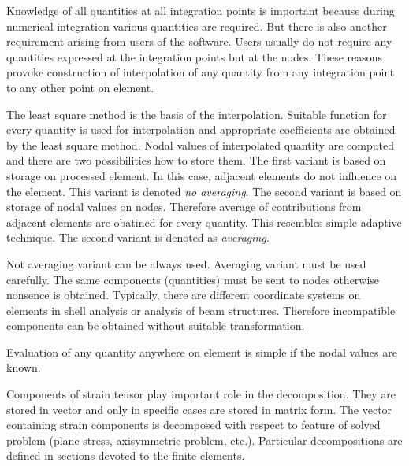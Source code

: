 Knowledge of all quantities at all integration points is important because during numerical integration
various quantities are required. But there is also another requirement arising from users of the software.
Users usually do not require any quantities expressed at the integration points but at the nodes.
These reasons provoke construction of interpolation of any quantity from any integration point to any other
point on element.

The least square method is the basis of the interpolation. Suitable function for every quantity is used for
interpolation and appropriate coefficients are obtained by the least square method. Nodal values of interpolated
quantity are computed and there are two possibilities how to store them. The first variant is based on storage
on processed element. In this case, adjacent elements do not influence on the element. This variant is denoted
{\it no averaging}. The second variant is based on storage of nodal values on nodes. Therefore average of contributions
from adjacent elements are obatined for every quantity. This resembles simple adaptive technique. The second
variant is denoted as {\it averaging}.

Not averaging variant can be always used. Averaging variant must be used carefully. The same components (quantities)
must be sent to nodes otherwise nonsence is obtained. Typically, there are different coordinate systems on elements
in shell analysis or analysis of beam structures. Therefore incompatible components can be obtained without
suitable transformation.


Evaluation of any quantity anywhere on element is simple if the nodal values are known.

Components of strain tensor play important role in the decomposition. They are stored in vector and only in specific
cases are stored in matrix form. The vector containing strain components is decomposed with respect to feature of
solved problem (plane stress, axisymmetric problem, etc.). Particular decompositions are defined in sections devoted
to the finite elements.

